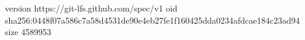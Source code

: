 version https://git-lfs.github.com/spec/v1
oid sha256:0448f07a586c7a58d4531de90e4eb27fe1f160425dda0234afdcae184c23ad94
size 4589953
